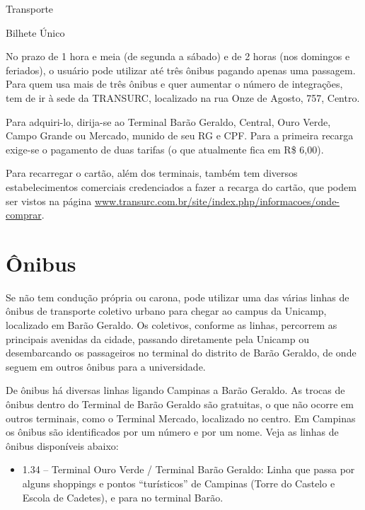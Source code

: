 
\begin{story}{Transporte}

\begin{sidebar}{Bilhete Único}

No prazo de 1 hora e meia (de segunda a sábado) e de 2 horas (nos domingos e feriados), o usuário pode utilizar até três ônibus pagando apenas uma passagem. Para quem usa mais de três ônibus e quer aumentar o número de integrações, tem de ir à sede da TRANSURC, localizado na rua Onze de Agosto, 757, Centro.

Para adquiri-lo, dirija-se ao Terminal Barão Geraldo, Central, Ouro Verde, Campo Grande ou Mercado, munido de seu RG e CPF. Para a primeira recarga exige-se o pagamento de duas tarifas (o que atualmente fica em R\$ 6,00).

Para recarregar o cartão, além dos terminais, também tem diversos estabelecimentos comerciais credenciados a fazer a recarga do cartão, que podem ser vistos na página \url{www.transurc.com.br/site/index.php/informacoes/onde-comprar}.

\end{sidebar}

\section*{Ônibus}

Se não tem condução própria ou carona, pode utilizar uma das várias linhas de ônibus de transporte coletivo urbano para chegar ao campus da Unicamp, localizado em Barão Geraldo. Os coletivos, conforme as linhas, percorrem as principais avenidas da cidade, passando diretamente pela Unicamp ou desembarcando os passageiros no terminal do distrito de Barão Geraldo, de onde seguem em outros ônibus para a universidade.

De ônibus há diversas linhas ligando Campinas a Barão Geraldo. As trocas de ônibus dentro do Terminal de Barão Geraldo são gratuitas, o que não ocorre em outros terminais, como o Terminal Mercado, localizado no centro. Em Campinas os ônibus são identificados por um número e por um nome. Veja as linhas de ônibus disponíveis abaixo:

\begin{itemize}
\item 1.34 -- Terminal Ouro Verde / Terminal Barão Geraldo: Linha que passa por alguns shoppings e pontos ``turísticos'' de Campinas (Torre do Castelo e Escola de Cadetes), e para no terminal Barão.


\end{itemize}
\end{story}
